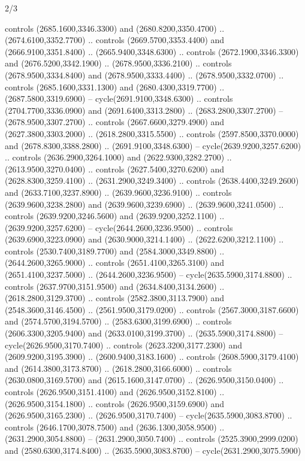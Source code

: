 \begin{flagdescription}{2/3}
\begin{scope}[shift={(0.5\flaglength,0.5)},scale=\flagwidth/130]
\begin{scope}[y=0.01mm, x=0.01mm,shift={(-3365,-2250)}]
  controls (2685.1600,3346.3300) and (2680.8200,3350.4700) ..
  (2674.6100,3352.7700) .. controls (2669.5700,3353.4400) and
  (2666.9100,3351.8400) .. (2665.9400,3348.6300) .. controls
  (2672.1900,3346.3300) and (2676.5200,3342.1900) .. (2678.9500,3336.2100) ..
  controls (2678.9500,3334.8400) and (2678.9500,3333.4400) ..
  (2678.9500,3332.0700) .. controls (2685.1600,3331.1300) and
  (2680.4300,3319.7700) .. (2687.5800,3319.6900) -- cycle(2691.9100,3348.6300)
  .. controls (2704.7700,3336.0900) and (2691.6400,3313.2800) ..
  (2683.2800,3307.2700) -- (2678.9500,3307.2700) .. controls
  (2667.6600,3279.4900) and (2627.3800,3303.2000) .. (2618.2800,3315.5500) ..
  controls (2597.8500,3370.0000) and (2678.8300,3388.2800) ..
  (2691.9100,3348.6300) -- cycle(2639.9200,3257.6200) .. controls
  (2636.2900,3264.1000) and (2622.9300,3282.2700) .. (2613.9500,3270.0400) ..
  controls (2627.5400,3270.6200) and (2628.8300,3259.4100) ..
  (2631.2900,3249.3400) .. controls (2638.4400,3249.2600) and
  (2633.7100,3237.8900) .. (2639.9600,3236.9100) .. controls
  (2639.9600,3238.2800) and (2639.9600,3239.6900) .. (2639.9600,3241.0500) ..
  controls (2639.9200,3246.5600) and (2639.9200,3252.1100) ..
  (2639.9200,3257.6200) -- cycle(2644.2600,3236.9500) .. controls
  (2639.6900,3223.0900) and (2630.9000,3214.1400) .. (2622.6200,3212.1100) ..
  controls (2530.7400,3189.7700) and (2584.3000,3349.8800) ..
  (2644.2600,3265.9000) .. controls (2651.4100,3265.3100) and
  (2651.4100,3237.5000) .. (2644.2600,3236.9500) -- cycle(2635.5900,3174.8800)
  .. controls (2637.9700,3151.9500) and (2634.8400,3134.2600) ..
  (2618.2800,3129.3700) .. controls (2582.3800,3113.7900) and
  (2548.3600,3146.4500) .. (2561.9500,3179.0200) .. controls
  (2567.3000,3187.6600) and (2574.5700,3194.5700) .. (2583.6300,3199.6900) ..
  controls (2606.3300,3205.9400) and (2633.0100,3199.3700) ..
  (2635.5900,3174.8800) -- cycle(2626.9500,3170.7400) .. controls
  (2623.3200,3177.2300) and (2609.9200,3195.3900) .. (2600.9400,3183.1600) ..
  controls (2608.5900,3179.4100) and (2614.3800,3173.8700) ..
  (2618.2800,3166.6000) .. controls (2630.0800,3169.5700) and
  (2615.1600,3147.0700) .. (2626.9500,3150.0400) .. controls
  (2626.9500,3151.4100) and (2626.9500,3152.8100) .. (2626.9500,3154.1800) ..
  controls (2626.9500,3159.6900) and (2626.9500,3165.2300) ..
  (2626.9500,3170.7400) -- cycle(2635.5900,3083.8700) .. controls
  (2646.1700,3078.7500) and (2636.1300,3058.9500) .. (2631.2900,3054.8800) --
  (2631.2900,3050.7400) .. controls (2525.3900,2999.0200) and
  (2580.6300,3174.8400) .. (2635.5900,3083.8700) -- cycle(2631.2900,3075.5900)

\end{scope}
\end{scope}
\end{flagdescription}
